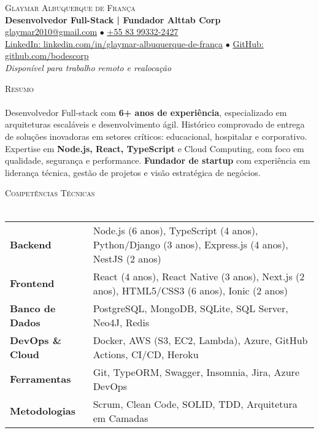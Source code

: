 \documentclass[a4paper]{article}
\newcommand{\lineunder}{
    \vspace*{-8pt} \\
    \hspace*{-18pt} \hrulefill \\
}
\newcommand{\header}[1]{
    {\hspace*{-18pt}\vspace*{6pt} \textsc{#1}}
    \vspace*{-6pt} \lineunder
}
\newcommand{\skillrow}[2]{
    \textbf{#1} & #2 \\
}
\begin{document}
\vspace*{-40pt}

%
%
\begin{center}
    {\Huge \scshape {Glaymar Albuquerque de França}}\\
    \vspace*{3pt}
    {\large \textbf{Desenvolvedor Full-Stack | Fundador Alttab Corp}}\\
    \vspace*{3pt}
    \href{mailto:glaymar2010@gmail.com}{glaymar2010@gmail.com} $\bullet$ \href{https://wa.me/+5583993322427}{+55 83 99332-2427} \\
    \vspace*{2pt}
    \href{https://www.linkedin.com/in/glaymar-albuquerque-de-fran\%C3\%A7a/}{LinkedIn: linkedin.com/in/glaymar-albuquerque-de-frança} $\bullet$ \href{https://github.com/bodescorp}{GitHub: github.com/bodescorp}\\
    \vspace*{3pt}
    \textit{Disponível para trabalho remoto e realocação} \\
\end{center}

%
%
\header{Resumo}
\vspace{2mm}
Desenvolvedor Full-stack com \textbf{6+ anos de experiência}, especializado em arquiteturas escaláveis e desenvolvimento ágil. 
Histórico comprovado de entrega de soluções inovadoras em setores críticos: educacional, hospitalar e corporativo. 
Expertise em \textbf{Node.js, React, TypeScript} e Cloud Computing, com foco em qualidade, segurança e performance.
\textbf{Fundador de startup} com experiência em liderança técnica, gestão de projetos e visão estratégica de negócios.
\vspace{2mm}

%
%
\header{Competências Técnicas}
\vspace{2mm}
\begin{longtable}{p{3.5cm}p{12.5cm}}
    \skillrow{Backend}{Node.js (6 anos), TypeScript (4 anos), Python/Django (3 anos), Express.js (4 anos), NestJS (2 anos)}
    \skillrow{Frontend}{React (4 anos), React Native (3 anos), Next.js (2 anos), HTML5/CSS3 (6 anos), Ionic (2 anos)}
    \skillrow{Banco de Dados}{PostgreSQL, MongoDB, SQLite, SQL Server, Neo4J, Redis}
    \skillrow{DevOps \& Cloud}{Docker, AWS (S3, EC2, Lambda), Azure, GitHub Actions, CI/CD, Heroku}
    \skillrow{Ferramentas}{Git, TypeORM, Swagger, Insomnia, Jira, Azure DevOps}
    \skillrow{Metodologias}{Scrum, Clean Code, SOLID, TDD, Arquitetura em Camadas}
\end{longtable}
\vspace{2mm}
\end{document}
